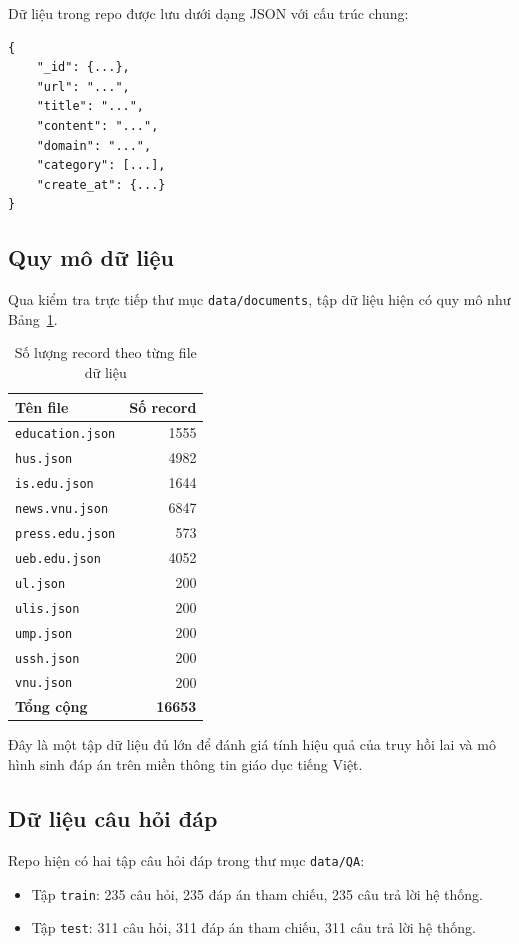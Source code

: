 \documentclass[12pt,a4paper]{article}
\begin{document}
Dữ liệu trong repo được lưu dưới dạng JSON với cấu trúc chung:

\begin{lstlisting}[style=pythonstyle]
{
    "_id": {...},
    "url": "...",
    "title": "...",
    "content": "...",
    "domain": "...",
    "category": [...],
    "create_at": {...}
}
\end{lstlisting}

\subsection{Quy mô dữ liệu}

Qua kiểm tra trực tiếp thư mục \texttt{data/documents}, tập dữ liệu hiện có quy mô như Bảng~\ref{tab:dataset-size}.

\begin{table}[H]
\centering
\caption{Số lượng record theo từng file dữ liệu}
\label{tab:dataset-size}
\begin{tabular}{lr}
\toprule
\textbf{Tên file} & \textbf{Số record} \\
\midrule
\texttt{education.json} & 1555 \\
\texttt{hus.json} & 4982 \\
\texttt{is.edu.json} & 1644 \\
\texttt{news.vnu.json} & 6847 \\
\texttt{press.edu.json} & 573 \\
\texttt{ueb.edu.json} & 4052 \\
\texttt{ul.json} & 200 \\
\texttt{ulis.json} & 200 \\
\texttt{ump.json} & 200 \\
\texttt{ussh.json} & 200 \\
\texttt{vnu.json} & 200 \\
\midrule
\textbf{Tổng cộng} & \textbf{16653} \\
\bottomrule
\end{tabular}
\end{table}

Đây là một tập dữ liệu đủ lớn để đánh giá tính hiệu quả của truy hồi lai và mô hình sinh đáp án trên miền thông tin giáo dục tiếng Việt.

\subsection{Dữ liệu câu hỏi đáp}

Repo hiện có hai tập câu hỏi đáp trong thư mục \texttt{data/QA}:
\begin{itemize}[leftmargin=1.5cm]
    \item Tập \texttt{train}: 235 câu hỏi, 235 đáp án tham chiếu, 235 câu trả lời hệ thống.
    \item Tập \texttt{test}: 311 câu hỏi, 311 đáp án tham chiếu, 311 câu trả lời hệ thống.
\end{itemize}
\end{document}
